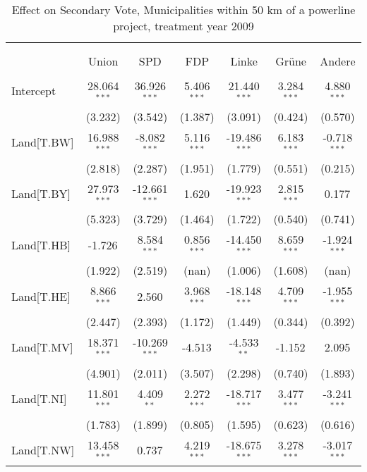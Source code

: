 \begin{table}[!htbp] \centering
  \caption{Effect on Secondary Vote, Municipalities within 50 km of a powerline project, treatment year 2009}
\begin{tabular}{@{\extracolsep{5pt}}lcccccc}
\\[-1.8ex]\hline
\hline \\[-1.8ex]
\\[-1.8ex] & \multicolumn{1}{c}{Union} & \multicolumn{1}{c}{SPD} & \multicolumn{1}{c}{FDP} & \multicolumn{1}{c}{Linke} & \multicolumn{1}{c}{Grüne} & \multicolumn{1}{c}{Andere}  \\
\hline \\[-1.8ex]
 Intercept & 28.064$^{***}$ & 36.926$^{***}$ & 5.406$^{***}$ & 21.440$^{***}$ & 3.284$^{***}$ & 4.880$^{***}$ \\
  & (3.232) & (3.542) & (1.387) & (3.091) & (0.424) & (0.570) \\
 Land[T.BW] & 16.988$^{***}$ & -8.082$^{***}$ & 5.116$^{***}$ & -19.486$^{***}$ & 6.183$^{***}$ & -0.718$^{***}$ \\
  & (2.818) & (2.287) & (1.951) & (1.779) & (0.551) & (0.215) \\
 Land[T.BY] & 27.973$^{***}$ & -12.661$^{***}$ & 1.620$^{}$ & -19.923$^{***}$ & 2.815$^{***}$ & 0.177$^{}$ \\
  & (5.323) & (3.729) & (1.464) & (1.722) & (0.540) & (0.741) \\
 Land[T.HB] & -1.726$^{}$ & 8.584$^{***}$ & 0.856$^{***}$ & -14.450$^{***}$ & 8.659$^{***}$ & -1.924$^{***}$ \\
  & (1.922) & (2.519) & (nan) & (1.006) & (1.608) & (nan) \\
 Land[T.HE] & 8.866$^{***}$ & 2.560$^{}$ & 3.968$^{***}$ & -18.148$^{***}$ & 4.709$^{***}$ & -1.955$^{***}$ \\
  & (2.447) & (2.393) & (1.172) & (1.449) & (0.344) & (0.392) \\
 Land[T.MV] & 18.371$^{***}$ & -10.269$^{***}$ & -4.513$^{}$ & -4.533$^{**}$ & -1.152$^{}$ & 2.095$^{}$ \\
  & (4.901) & (2.011) & (3.507) & (2.298) & (0.740) & (1.893) \\
 Land[T.NI] & 11.801$^{***}$ & 4.409$^{**}$ & 2.272$^{***}$ & -18.717$^{***}$ & 3.477$^{***}$ & -3.241$^{***}$ \\
  & (1.783) & (1.899) & (0.805) & (1.595) & (0.623) & (0.616) \\
 Land[T.NW] & 13.458$^{***}$ & 0.737$^{}$ & 4.219$^{***}$ & -18.675$^{***}$ & 3.278$^{***}$ & -3.017$^{***}$ \\

\end{tabular}
\end{table}
